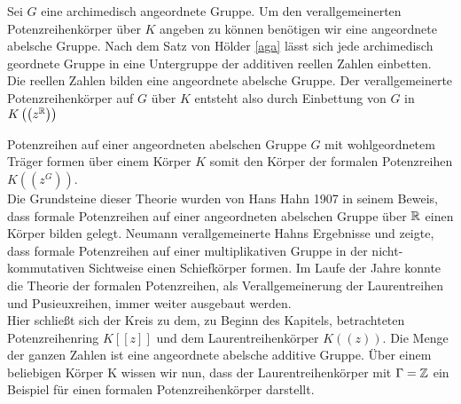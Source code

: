 %
%
%
%
\begin{bsp}
Sei $G$ eine archimedisch angeordnete Gruppe. Um den verallgemeinerten Potenzreihenkörper über $K$ angeben zu können benötigen wir eine angeordnete abelsche Gruppe. Nach dem Satz von Hölder \ref{aga} lässt sich jede archimedisch geordnete Gruppe in eine Untergruppe der additiven reellen Zahlen einbetten.
Die reellen Zahlen bilden eine angeordnete abelsche Gruppe. Der verallgemeinerte Potenzreihenkörper auf $G$ über $K$ entsteht also durch Einbettung von $G$ in $K\left(\left(z^{\mathbb{R}}\right)\right)$
\end{bsp}
%
%
% 
%
%
%
%
Potenzreihen auf einer angeordneten abelschen Gruppe $G$ mit wohlgeordnetem Träger formen über einem Körper $K$ somit den Körper der formalen Potenzreihen $K\left(\left(z^{G}\right)\right)$. \\
Die Grundsteine dieser Theorie wurden von Hans Hahn 1907 in seinem Beweis, dass formale Potenzreihen auf einer angeordneten abelschen Gruppe über $\mathbb{R}$ einen Körper bilden gelegt. Neumann verallgemeinerte Hahns Ergebnisse und zeigte, dass formale Potenzreihen auf einer multiplikativen Gruppe in der nicht-kommutativen Sichtweise einen Schiefkörper formen. Im Laufe der Jahre konnte die Theorie der formalen Potenzreihen, als Verallgemeinerung der Laurentreihen und Pusieuxreihen, immer weiter ausgebaut werden. \\
Hier schließt sich der Kreis zu dem, zu Beginn des Kapitels, betrachteten Potenzreihenring $K[[z]]$ und dem Laurentreihenkörper $K((z))$. Die Menge der ganzen Zahlen ist eine angeordnete abelsche additive Gruppe. Über einem beliebigen Körper K wissen wir nun, dass der Laurentreihenkörper mit $\Gamma = \mathbb{Z}$ ein Beispiel für einen formalen Potenzreihenkörper darstellt.
%
%
%
